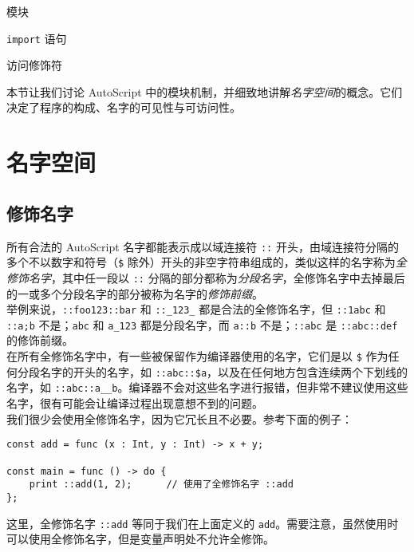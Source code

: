\begin{introduction}
	\item 模块
	\item \lstinline!import! 语句
	\item 访问修饰符
\end{introduction}

本节让我们讨论 AutoScript 中的模块机制，并细致地讲解\emph{名字空间}的概念。它们决定了程序的构成、名字的可见性与可访问性。

\section{名字空间}

\subsection{修饰名字}

所有合法的 AutoScript 名字都能表示成以域连接符 \lstinline!::! 开头，由域连接符分隔的多个不以数字和符号（\texttt{\$} 除外）开头的非空字符串组成的，类似这样的名字称为\emph{全修饰名字}，其中任一段以 \lstinline!::! 分隔的部分都称为\emph{分段名字}，全修饰名字中去掉最后的一或多个分段名字的部分被称为名字的\emph{修饰前缀}。 \\

举例来说，\texttt{::foo123::bar} 和 \texttt{::\_123\_} 都是合法的全修饰名字，但 \texttt{::1abc} 和 \texttt{::a;b} 不是；\texttt{abc} 和 \texttt{a\_123} 都是分段名字，而 \texttt{a::b} 不是；\texttt{::abc} 是 \texttt{::abc::def} 的修饰前缀。 \\

在所有全修饰名字中，有一些被保留作为编译器使用的名字，它们是以 \texttt{\$} 作为任何分段名字的开头的名字，如 \texttt{::abc::\$a}，以及在任何地方包含连续两个下划线的名字，如 \texttt{::abc::a\_\_b}。编译器不会对这些名字进行报错，但非常不建议使用这些名字，很有可能会让编译过程出现意想不到的问题。 \\

我们很少会使用全修饰名字，因为它冗长且不必要。参考下面的例子：

\begin{lstlisting}
const add = func (x : Int, y : Int) -> x + y;

const main = func () -> do {
	print ::add(1, 2);		// 使用了全修饰名字 ::add
};
\end{lstlisting}

这里，全修饰名字 \lstinline!::add! 等同于我们在上面定义的 \lstinline!add!。需要注意，虽然使用时可以使用全修饰名字，但是变量声明处不允许全修饰。 \\

